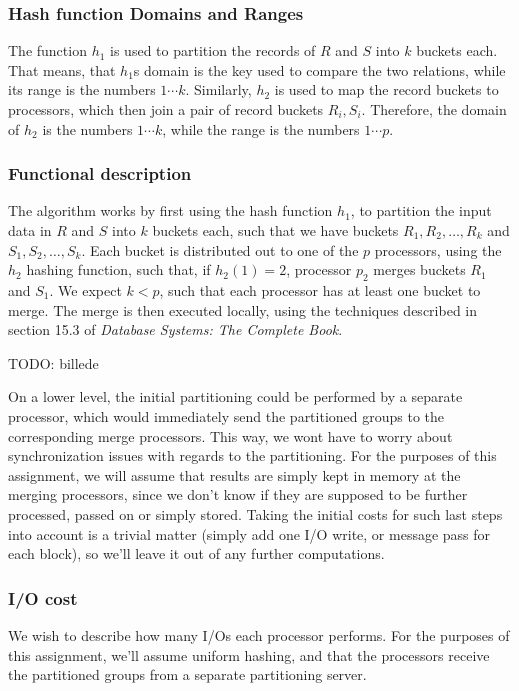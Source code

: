 \documentclass[a4paper, 12pt]{article}
\begin{document}
\subsubsection*{Hash function Domains and Ranges}

The function $h_1$ is used to partition the records of $R$ and $S$
into $k$ buckets each. That means, that $h_1$s domain is the key used
to compare the two relations, while its range is the numbers $1\cdots
k$. Similarly, $h_2$ is used to map the record buckets to processors,
which then join a pair of record buckets $R_i, S_i$. Therefore, the
domain of $h_2$ is the numbers $1 \cdots k$, while the range is the
numbers $1 \cdots p$.

\subsubsection*{Functional description}

The algorithm works by first using the hash function $h_1$, to
partition the input data in $R$ and $S$ into $k$ buckets each, such
that we have buckets $R_1, R_2, \ldots, R_k$ and $S_1, S_2, \dots,
S_k$. Each bucket is distributed out to one of the $p$ processors,
using the $h_2$ hashing function, such that, if $h_2(1) = 2$,
processor $p_2$ merges buckets $R_1$ and $S_1$. We expect $k<p$, such
that each processor has at least one bucket to merge. The merge is
then executed locally, using the techniques described in section 15.3
of \emph{Database Systems: The Complete Book}.

TODO: billede

On a lower level, the initial partitioning could be performed by a
separate processor, which would immediately send the partitioned
groups to the corresponding merge processors. This way, we wont have
to worry about synchronization issues with regards to the
partitioning. For the purposes of this assignment, we will assume that
results are simply kept in memory at the merging processors, since we
don't know if they are supposed to be further processed, passed on or
simply stored. Taking the initial costs for such last steps into
account is a trivial matter (simply add one I/O write, or message pass
for each block), so we'll leave it out of any further computations.

\subsubsection*{I/O cost}

We wish to describe how many I/Os each processor performs. For the
purposes of this assignment, we'll assume uniform hashing, and that
the processors receive the partitioned groups from a separate
partitioning server.
\end{document}
